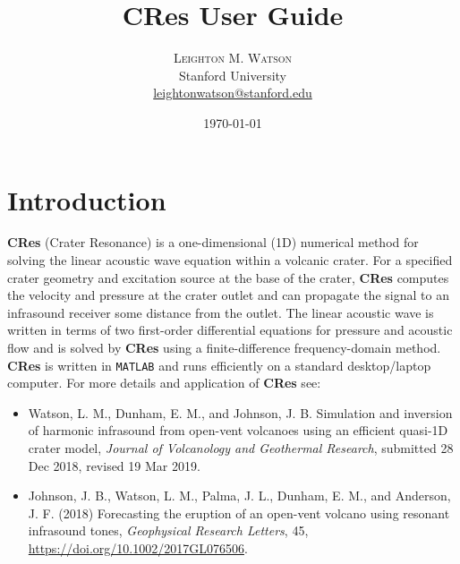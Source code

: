 \documentclass[10pt]{article}
\title{CRes User Guide} %
\author{%
\textsc{Leighton M. Watson} \\%
\normalsize Stanford University \\ %
\normalsize \href{mailto:leightonwatson@stanford.edu}{leightonwatson@stanford.edu} %
}
\date{\today} %
\begin{document}
\maketitle


\section{Introduction}
{\bf CRes} (Crater Resonance) is a one-dimensional (1D) numerical method for solving the linear acoustic wave equation within a volcanic crater. For a specified crater geometry and excitation source at the base of the crater, {\bf CRes} computes the velocity and pressure at the crater outlet and can propagate the signal to an infrasound receiver some distance from the outlet. The linear acoustic wave is written in terms of two first-order differential equations for pressure and acoustic flow and is solved by {\bf CRes} using a finite-difference frequency-domain method. {\bf CRes} is written in \texttt{MATLAB} and runs efficiently on a standard desktop/laptop computer. For more details and application of {\bf CRes} see:
\begin{itemize}
\item Watson, L. M., Dunham, E. M., and Johnson, J. B. Simulation and inversion of harmonic infrasound from open-vent volcanoes using an efficient quasi-1D crater model, \emph{Journal of Volcanology and Geothermal Research}, submitted 28 Dec 2018, revised 19 Mar 2019.
\item Johnson, J. B., Watson, L. M., Palma, J. L., Dunham, E. M., and Anderson, J. F. (2018) Forecasting the eruption of an open-vent volcano using resonant infrasound tones, \emph{Geophysical Research Letters}, 45, \href{https://doi.org/10.1002/2017GL076506}{https://doi.org/10.1002/2017GL076506}.
\end{itemize}
\end{document}
